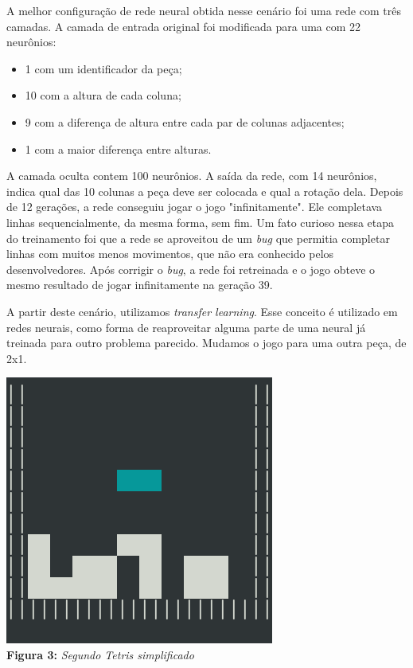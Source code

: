 \documentclass[conference]{IEEEtran}
\begin{document}
A melhor configuração de rede neural obtida nesse cenário foi uma rede com três camadas. A camada de entrada original foi modificada para uma com 22 neurônios:  

\begin{itemize}
\item 1 com um identificador da peça;
\item 10 com a altura de cada coluna;
\item 9 com a diferença de altura entre cada par de colunas adjacentes;
\item 1 com a maior diferença entre alturas.
\end{itemize}

A camada oculta contem 100 neurônios. A saída da rede, com 14 neurônios, indica qual das 10 colunas a peça deve ser colocada e qual a rotação dela. Depois de 12 gerações, a rede conseguiu jogar o jogo "infinitamente". Ele completava linhas sequencialmente, da mesma forma, sem fim. Um fato curioso nessa etapa do treinamento foi que a rede se aproveitou de um \textit{bug} que permitia completar linhas com muitos menos movimentos, que não era conhecido pelos desenvolvedores. Após corrigir o \textit{bug}, a rede foi retreinada e o jogo obteve o mesmo resultado de jogar infinitamente na geração 39.

A partir deste cenário, utilizamos \textit{transfer learning}. Esse conceito é utilizado em redes neurais, como forma de reaproveitar alguma parte de uma neural já treinada para outro problema parecido. Mudamos o jogo para uma outra peça, de 2x1.

\begin{center}
\includegraphics[scale=0.3]{tetris_simples2.png}\\

\textbf{Figura 3:} \textit{Segundo Tetris simplificado}
\end{center}
\end{document}
